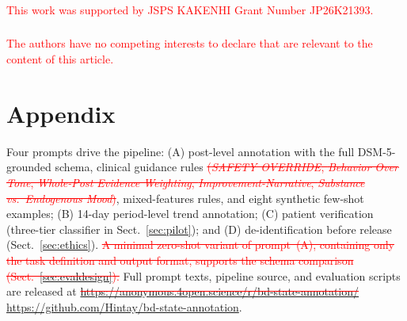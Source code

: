 \documentclass[runningheads]{llncs}
\newcommand{\rev}[1]{\textcolor{red}{#1}}
\newcommand{\del}[1]{\textcolor{red}{\sout{#1}}}
\newcommand{\rev}[1]{#1}
\newcommand{\del}[1]{}
\begin{document}
\begin{credits}
\subsubsection{\ackname}
\rev{This work was supported by JSPS KAKENHI Grant Number JP26K21393.}

\subsubsection{\discintname}
\rev{The authors have no competing interests to declare that are relevant to the content of this article.}
\end{credits}

\section*{Appendix}

Four prompts drive the pipeline: (A) post-level annotation with the full DSM-5-grounded schema, clinical guidance rules\del{ (\emph{SAFETY OVERRIDE}, \emph{Behavior Over Tone}, \emph{Whole-Post Evidence Weighting}, \emph{Improvement-Narrative}, \emph{Substance vs.~Endogenous Mood})}, mixed-features rules, and eight synthetic few-shot examples; (B) 14-day period-level trend annotation; (C) patient verification (three-tier classifier in Sect.~\ref{sec:pilot}); and (D) de-identification before release (Sect.~\ref{sec:ethics}). \del{A minimal zero-shot variant of prompt~(A), containing only the task definition and output format, supports the schema comparison (Sect.~\ref{sec:evaldesign}).} Full prompt texts, pipeline source, and evaluation scripts are released at \del{\url{https://anonymous.4open.science/r/bd-state-annotation/}} \rev{\url{https://github.com/Hintay/bd-state-annotation}}.



\end{document}
